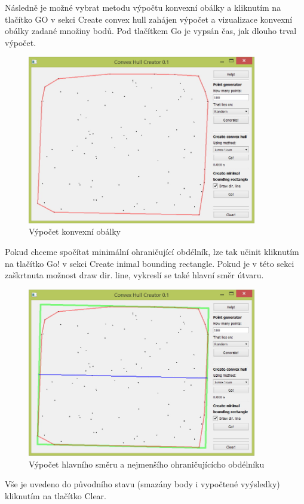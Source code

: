 \documentclass[a4paper, 12pt]{article}
\begin{document}
Následně je možné vybrat metodu výpočtu konvexní obálky a kliknutím na tlačítko GO v 
sekci Create convex hull zahájen výpočet a vizualizace konvexní obálky zadané množiny bodů.
Pod tlačítkem Go je vypsán čas, jak dlouho trval výpočet.\\
\begin{figure}[h!]
	\centering
	\includegraphics[width=10cm]{vystup.jpg}
	\caption{Výpočet konvexní obálky}
\end{figure}


Pokud chceme spočítat minimální ohraničující obdélník, lze tak učinit kliknutím
 na tlačítko Go! v sekci  Create inimal bounding rectangle. Pokud je v této sekci
 zaškrtnuta možnost draw dir. line, vykreslí se také hlavní směr útvaru.\\
\begin{figure}[h!]
	\centering
	\includegraphics[width=10cm]{min_bound.jpg}
	\caption{Výpočet hlavního směru a nejmenšího ohraničujícícho obdélníku}
\end{figure}

Vše je uvedeno do původního stavu (smazány body i vypočtené vyýsledky) kliknutím na tlačítko Clear.\\
\end{document}
